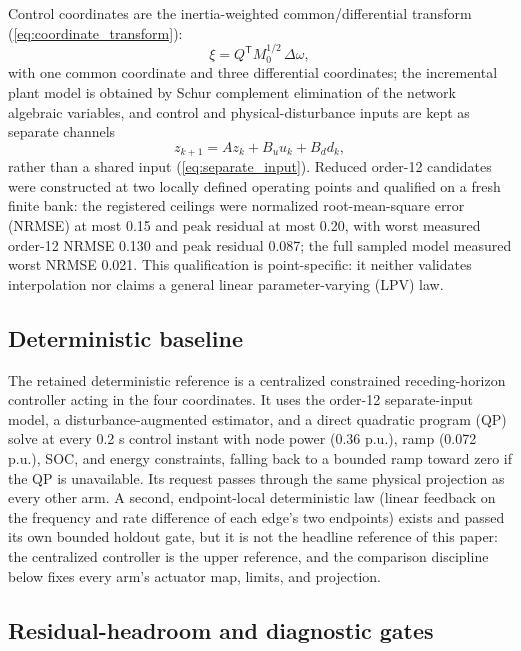\documentclass[journal]{IEEEtran}
\begin{document}
Control coordinates are the inertia-weighted common/differential transform (\ref{eq:coordinate_transform}):
\begin{equation}
\xi = Q^{\mathsf{T}} M_0^{1/2}\,\Delta\omega,
\label{eq:coordinate_transform}
\end{equation}
with one common coordinate and three differential coordinates; the incremental plant model is obtained by Schur complement elimination of the network algebraic variables, and control and physical-disturbance inputs are kept as separate channels
\begin{equation}
z_{k+1} = A z_k + B_u u_k + B_d d_k,
\label{eq:separate_input}
\end{equation}
rather than a shared input (\ref{eq:separate_input}). Reduced order-12 candidates were constructed at two locally defined operating points and qualified on a fresh finite bank: the registered ceilings were normalized root-mean-square error (NRMSE) at most 0.15 and peak residual at most 0.20, with worst measured order-12 NRMSE 0.130 and peak residual 0.087; the full sampled model measured worst NRMSE 0.021. This qualification is point-specific: it neither validates interpolation nor claims a general linear parameter-varying (LPV) law.

\subsection{Deterministic baseline}
\label{sec:deterministic}

The retained deterministic reference is a centralized constrained receding-horizon controller acting in the four coordinates. It uses the order-12 separate-input model, a disturbance-augmented estimator, and a direct quadratic program (QP) solve \cite{stellato2020osqp} at every 0.2 s control instant with node power (0.36 p.u.), ramp (0.072 p.u.), SOC, and energy constraints, falling back to a bounded ramp toward zero if the QP is unavailable. Its request passes through the same physical projection as every other arm. A second, endpoint-local deterministic law (linear feedback on the frequency and rate difference of each edge's two endpoints) exists and passed its own bounded holdout gate, but it is not the headline reference of this paper: the centralized controller is the upper reference, and the comparison discipline below fixes every arm's actuator map, limits, and projection.

\subsection{Residual-headroom and diagnostic gates}
\label{sec:residual-gates}
\end{document}
